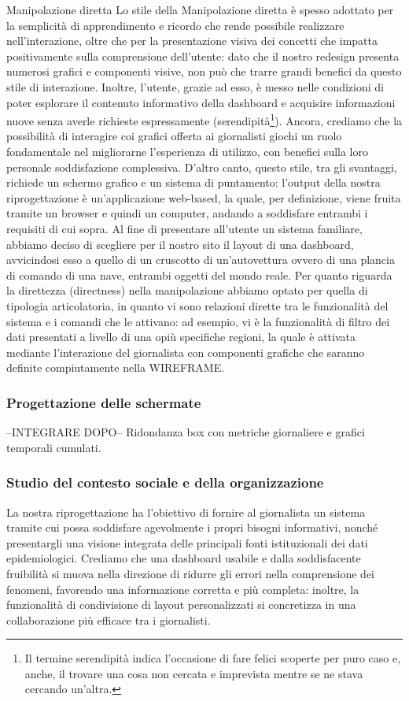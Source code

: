 Manipolazione diretta
Lo stile della Manipolazione diretta è spesso adottato per la semplicità di apprendimento e ricordo che rende possibile realizzare nell'interazione, oltre che per la presentazione visiva dei concetti che impatta positivamente sulla comprensione dell'utente: dato che il nostro redesign  presenta numerosi grafici e componenti visive, non può che trarre grandi benefici da questo stile di interazione. Inoltre, l'utente, grazie ad esso, è messo nelle condizioni di poter esplorare il contenuto informativo della dashboard e acquisire informazioni nuove senza averle richieste espressamente (serendipità\footnote{Il termine serendipità indica l'occasione di fare felici scoperte per puro caso e, anche, il trovare una cosa non cercata e imprevista mentre se ne stava cercando un'altra.}).
Ancora, crediamo che la possibilità di interagire coi grafici offerta ai giornalisti giochi un ruolo fondamentale nel migliorarne l'esperienza di utilizzo, con benefici sulla loro personale soddisfazione complessiva.
D'altro canto, questo stile, tra gli svantaggi, richiede un schermo grafico e un sistema di puntamento: l'output della nostra riprogettazione è un'applicazione web-based, la quale, per definizione, viene fruita tramite un browser e quindi un computer, andando a soddisfare entrambi i requisiti di cui sopra. Al fine di presentare all'utente un sistema familiare, abbiamo deciso di scegliere per il nostro sito il layout di una dashboard, avvicindosi esso a quello di un cruscotto di un'autovettura ovvero di una plancia di comando di una nave, entrambi oggetti del mondo reale.
Per quanto riguarda la direttezza (directness) nella manipolazione abbiamo optato per quella di tipologia articolatoria, in quanto vi sono relazioni dirette tra le funzionalità del sistema e i comandi che le attivano: ad esempio, vi è la funzionalità di filtro dei dati presentati a livello di una opiù specifiche regioni, la quale è attivata mediante l'interazione del giornalista con componenti grafiche che saranno definite compiutamente nella WIREFRAME.

\subsubsection{Progettazione delle schermate}
--INTEGRARE DOPO--
Ridondanza box con metriche giornaliere e grafici temporali cumulati.

\subsubsection{Studio del contesto sociale e della organizzazione}
La nostra riprogettazione ha l'obiettivo di fornire al giornalista un sistema tramite cui possa soddisfare agevolmente i propri bisogni informativi, nonché presentargli una visione integrata delle principali fonti istituzionali dei dati epidemiologici. Crediamo che una dashboard usabile e dalla soddisfacente fruibilità si muova nella direzione di ridurre gli errori nella comprensione dei fenomeni, favorendo una informazione corretta e più completa: inoltre, la funzionalità di condivisione di layout personalizzati si concretizza in una collaborazione più efficace tra i giornalisti.
